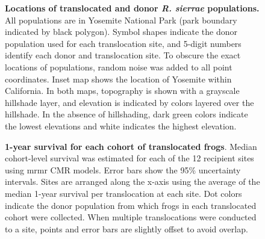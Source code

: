 \documentclass[
  letterpaper,
  DIV=11,
  numbers=noendperiod]{scrartcl}
\begin{document}
\newpage

\begin{figure}


\caption{\label{fig-yosemap}\textbf{Locations of translocated and donor
\emph{R. sierrae} populations.} All populations are in Yosemite National
Park (park boundary indicated by black polygon). Symbol shapes indicate
the donor population used for each translocation site, and 5-digit
numbers identify each donor and translocation site. To obscure the exact
locations of populations, random noise was added to all point
coordinates. Inset map shows the location of Yosemite within California.
In both maps, topography is shown with a grayscale hillshade layer, and
elevation is indicated by colors layered over the hillshade. In the
absence of hillshading, dark green colors indicate the lowest elevations
and white indicates the highest elevation.}

\end{figure}%

\newpage

\begin{figure}


\caption{\label{fig-translocation-survival}\textbf{1-year survival for
each cohort of translocated frogs}. Median cohort-level survival was
estimated for each of the 12 recipient sites using mrmr CMR models.
Error bars show the 95\% uncertainty intervals. Sites are arranged along
the x-axis using the average of the median 1-year survival per
translocation at each site. Dot colors indicate the donor population
from which frogs in each translocated cohort were collected. When
multiple translocations were conducted to a site, points and error bars
are slightly offset to avoid overlap.}

\end{figure}%

\newpage
\end{document}
